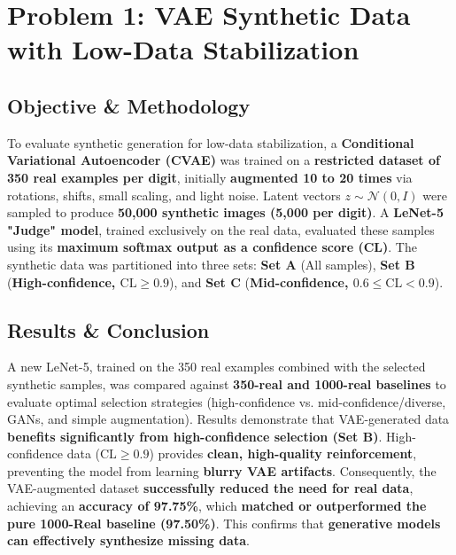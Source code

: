 \section{Problem 1: VAE Synthetic Data with Low-Data Stabilization}

\subsection{Objective \& Methodology}
To evaluate synthetic generation for low-data stabilization, a \textbf{Conditional Variational Autoencoder (CVAE)} was trained on a \textbf{restricted dataset of 350 real examples per digit}, initially \textbf{augmented 10 to 20 times} via rotations, shifts, small scaling, and light noise. Latent vectors $z \sim \mathcal{N}(0,I)$ were sampled to produce \textbf{50,000 synthetic images (5,000 per digit)}. A \textbf{LeNet-5 "Judge" model}, trained exclusively on the real data, evaluated these samples using its \textbf{maximum softmax output as a confidence score (CL)}. The synthetic data was partitioned into three sets: \textbf{Set A} (All samples), \textbf{Set B} (\textbf{High-confidence, $\text{CL} \geq 0.9$}), and \textbf{Set C} (\textbf{Mid-confidence, $0.6 \leq \text{CL} < 0.9$}).

\subsection{Results \& Conclusion}
A new LeNet-5, trained on the 350 real examples combined with the selected synthetic samples, was compared against \textbf{350-real and 1000-real baselines} to evaluate optimal selection strategies (high-confidence vs. mid-confidence/diverse, GANs, and simple augmentation). Results demonstrate that VAE-generated data \textbf{benefits significantly from high-confidence selection (Set B)}. High-confidence data ($\text{CL} \geq 0.9$) provides \textbf{clean, high-quality reinforcement}, preventing the model from learning \textbf{blurry VAE artifacts}. Consequently, the VAE-augmented dataset \textbf{successfully reduced the need for real data}, achieving an \textbf{accuracy of 97.75\%}, which \textbf{matched or outperformed the pure 1000-Real baseline (97.50\%)}. This confirms that \textbf{generative models can effectively synthesize missing data}.

